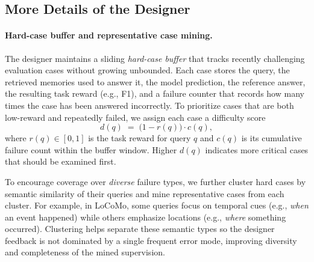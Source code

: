 \subsection{More Details of the Designer}
\label{appendix:detail_component}

\paragraph{Hard-case buffer and representative case mining.}
The designer maintains a sliding \emph{hard-case buffer} that tracks recently challenging evaluation cases without growing unbounded. 
Each case stores the query, the retrieved memories used to answer it, the model prediction, the reference answer, the resulting task reward (e.g., F1), and a failure counter that records how many times the case has been answered incorrectly.
To prioritize cases that are both low-reward and repeatedly failed, we assign each case a difficulty score
\begin{equation}
d(q) \;=\; \big(1 - r(q)\big)\cdot c(q),
\end{equation}
where $r(q)\in[0,1]$ is the task reward for query $q$ and $c(q)$ is its cumulative failure count within the buffer window. Higher $d(q)$ indicates more critical cases that should be examined first.

To encourage coverage over \emph{diverse} failure types, we further cluster hard cases by semantic similarity of their queries and mine representative cases from each cluster.
For example, in LoCoMo, some queries focus on temporal cues (e.g., \emph{when} an event happened) while others emphasize locations (e.g., \emph{where} something occurred). 
Clustering helps separate these semantic types so the designer feedback is not dominated by a single frequent error mode, improving diversity and completeness of the mined supervision.

